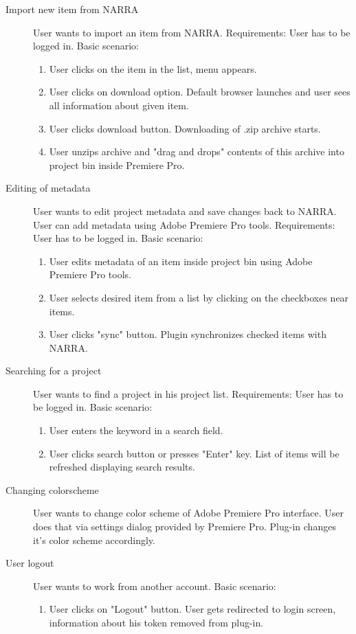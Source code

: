 \documentclass[thesis=B,english]{FITthesis}[2012/10/20]
\begin{document}
\begin{description}
\begin{itemize}
	\end{itemize}
		\item[Import new item from NARRA]
User wants to import an item from NARRA. Requirements: User has to be logged in. Basic scenario:
	\begin{enumerate}
		\item User clicks on the item in the list, menu appears.
		\item User clicks on download option. Default browser launches and user sees all information about given item.
		\item User clicks download button. Downloading of .zip archive starts.
		\item User unzips archive and "drag and drops" contents of this archive into project bin inside Premiere Pro.
	\end{enumerate}
		\item[Editing of metadata]
User wants to edit project metadata and save changes back to NARRA. User can add metadata using Adobe Premiere Pro tools. Requirements: User has to be logged in. Basic scenario:
	\begin{enumerate}
		\item User edits metadata of an item inside project bin using Adobe Premiere Pro tools.
		\item User selects desired item from a list by clicking on the checkboxes near items.
		\item User clicks "sync" button. Plugin synchronizes checked items with NARRA.
	\end{enumerate}
		\item[Searching for a project]
User wants to find a project in his project list. Requirements: User has to be logged in. Basic scenario: 
	\begin{enumerate}
		\item User enters the keyword in a search field.
		\item User clicks search button or presses "Enter" key. List of items will be refreshed displaying search results.
	\end{enumerate}
		\item [Changing colorscheme]
User wants to change color scheme of Adobe Premiere Pro interface. User does that via settings dialog provided by Premiere Pro. Plug-in changes it's color scheme accordingly.
		\item [User logout]
User wants to work from another account. Basic scenario:
	\begin{enumerate}
		\item User clicks on "Logout" button. User gets redirected to login screen, information about his token removed from plug-in.

\end{enumerate}
\end{description}
\end{document}

